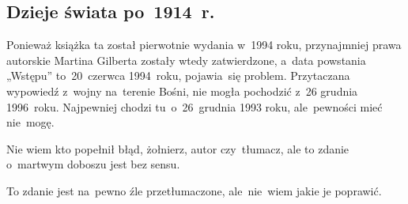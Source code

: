 \documentclass[a4paper,11pt]{article}
\begin{document}
\vspace{\spaceTwo}





\subsection{Dzieje świata po~1914~r.}

\vspace{\spaceThree}






\start {} Ponieważ książka ta został pierwotnie wydania
w~1994 roku, przynajmniej prawa autorskie Martina Gilberta zostały
wtedy zatwierdzone, a~data powstania „Wstępu” to~20~czerwca 1994~roku,
pojawia~się problem. Przytaczana wypowiedź z~wojny na~terenie Bośni,
nie mogła pochodzić z~26 grudnia 1996~roku. Najpewniej chodzi
tu~o~26~grudnia 1993 roku, ale~pewności mieć nie~mogę.

\vspace{\spaceFour}


\start {} Nie wiem kto popełnił błąd, żołnierz, autor
czy~tłumacz, ale to zdanie o~martwym doboszu jest bez sensu.

\vspace{\spaceFour}


\start {} To zdanie jest na~pewno źle przetłumaczone,
ale~nie~wiem jakie je poprawić.
\end{document}
